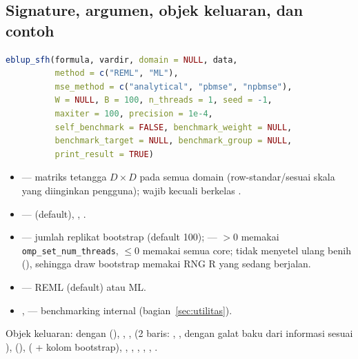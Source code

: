 \subsection{Signature, argumen, objek keluaran, dan contoh}\label{sec:sfh-api}

\begin{lstlisting}[language=R,caption={Signature \texttt{eblup\_sfh} (\texttt{R/eblup\_sfh.R:131-149}).}]
eblup_sfh(formula, vardir, domain = NULL, data,
          method = c("REML", "ML"),
          mse_method = c("analytical", "pbmse", "npbmse"),
          W = NULL, B = 100, n_threads = 1, seed = -1,
          maxiter = 100, precision = 1e-4,
          self_benchmark = FALSE, benchmark_weight = NULL,
          benchmark_target = NULL, benchmark_group = NULL,
          print_result = TRUE)
\end{lstlisting}

\begin{itemize}
  \item {} --- matriks tetangga $D\times D$ pada semua domain
        (row-standar/sesuai skala yang diinginkan pengguna); wajib kecuali
         berkelas .
  \item {} ---  (default), ,
        .
  \item {} --- jumlah replikat bootstrap (default 100);
         --- $>0$ memakai \texttt{omp\_set\_num\_threads},
        $\le0$ memakai semua core;  tidak menyetel ulang
        benih (), sehingga draw bootstrap
        memakai RNG R yang sedang berjalan.
  \item {} --- REML (default) atau ML.
  \item {},  --- benchmarking internal
        (bagian~\ref{sec:utilitas}).
\end{itemize}

Objek keluaran:  dengan 
(), ,
,  (2 baris: , , dengan
galat baku dari informasi sesuai ), 
(),  ( + kolom bootstrap), , ,
, , , .

